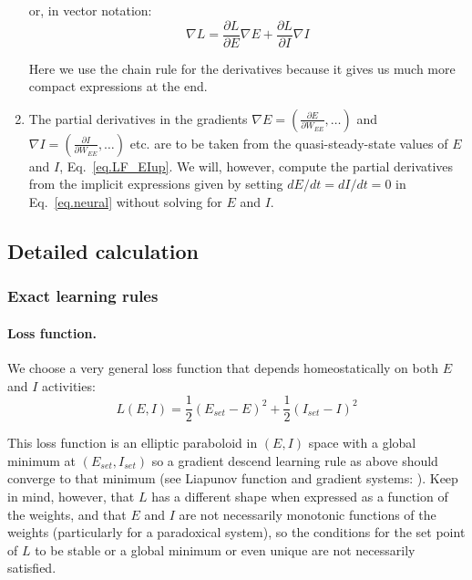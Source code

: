 \documentclass[twocolumn]{article}
\newcommand{\set}{\mathit{set}}
\begin{document}
\begin{enumerate}
\noindent or, in vector notation:
\begin{equation}
\nabla L = \frac{\partial L}{\partial E} \nabla E + \frac{\partial L}{\partial I} \nabla I
\label{eq.LF_partial}
\end{equation}

\noindent Here we use the chain rule for the derivatives because it gives us much more compact expressions at the end.

\item The partial derivatives in the gradients $\displaystyle \nabla E = \left(\frac{\partial E}{\partial W_{EE}}, \ldots \right)$ and $\displaystyle \nabla I = \left( \frac{\partial I}{\partial W_{EE}}, \ldots \right)$ etc. are to be taken from the quasi-steady-state values of $E$ and $I$, Eq.\ \ref{eq.LF_EIup}. We will, however, compute the partial derivatives from the implicit expressions given by setting $dE/dt=dI/dt=0$ in Eq.\ \ref{eq.neural} without solving for $E$ and $I$.
\end{enumerate}


\subsection{Detailed calculation}

\subsubsection{Exact learning rules}

\paragraph{Loss function.}

We choose a very general loss function that depends homeostatically on both $E$ and $I$ activities:
\begin{equation}
L(E,I) = \frac{1}{2}(E_{set} - E)^2 + \frac{1}{2}(I_{set} - I)^2
\label{eq.LF_energy}
\end{equation}

\noindent This loss function is an elliptic paraboloid in $(E,I)$ space with a global minimum at $(E_{\set},I_{\set})$ so a gradient descend learning rule as above should converge to that minimum (see Liapunov function and gradient systems: \cite[Section 1.1B]{Wiggins1996}\cite[Sections 9.3 and 9.4]{Hirsch1974}\cite[Section 7.2]{Strogatz2018}). Keep in mind, however, that $L$ has a different shape when expressed as a function of the weights, and that $E$ and $I$ are not necessarily monotonic functions of the weights (particularly for a paradoxical system), so the conditions for the set point of $L$ to be stable or a global minimum or even unique are not necessarily satisfied.
\end{document}
